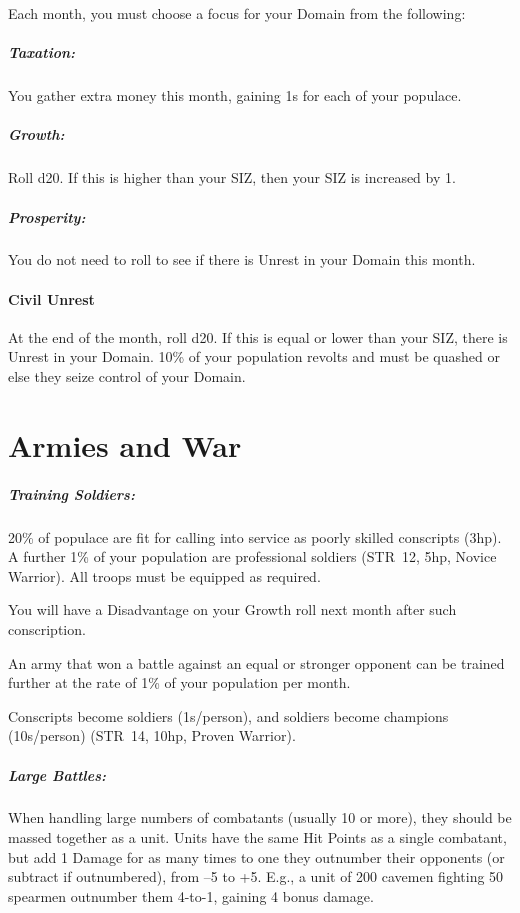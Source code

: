 \documentclass[itdr]{subfiles}
\begin{document}
Each month, you must choose a focus for your \mbox{Domain} from the following:

\subparagraph{Taxation:} You gather extra money this month, gaining 1s for each of your populace.

\subparagraph{Growth:} Roll d20. If this is higher than your SIZ, then your SIZ is increased by 1.

\subparagraph{Prosperity:} You do not need to roll to see if there is Unrest in your Domain this month.

\paragraph{Civil Unrest}
At the end of the month, roll d20. If this is equal or lower than your SIZ, there is Unrest in your Domain. 10\% of your population revolts and must be quashed or else they seize control of your Domain.


\section{Armies and War}


\subparagraph{Training Soldiers:} 20\% of populace are fit for calling into service as poorly skilled conscripts (3hp). A further 1\% of your population are professional soldiers (STR~12, 5hp, Novice Warrior). All troops must be equipped as required.

You will have a Disadvantage on your Growth roll next month after such conscription.

An army that won a battle against an equal or stronger opponent can be trained further at the rate of 1\% of your population per month.

Conscripts become soldiers (1s/person), and \mbox{soldiers} become champions (10s/person) (STR~14, 10hp, Proven Warrior).


\subparagraph{Large Battles:} When handling large numbers of combatants (usually 10 or more), they should be massed together as a unit. Units have the same Hit Points as a single combatant, but add 1 Damage for as many times to one they outnumber their opponents (or subtract if outnumbered), from --5 to +5. E.g., a unit of 200 cavemen fighting 50 spearmen outnumber them \mbox{4-to-1}, gaining 4 bonus damage.
\end{document}
